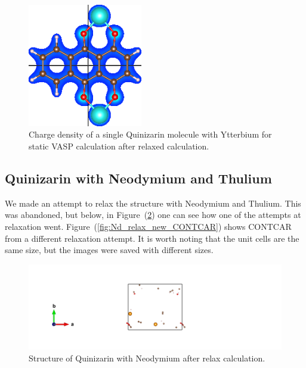 \documentclass{article}
\begin{document}
      \begin{figure}[H]
        \centering
        \includegraphics[width = 5cm]{../fig/Yb_staticafter_CHGDENSITY.png}
        \caption{Charge density of a single Quinizarin molecule with Ytterbium for static VASP calculation after relaxed calculation. }
        \label{fig:Yb_staticafter_CHGDENSITY}
      \end{figure}

      \vspace{1cm}

  \subsection{Quinizarin with Neodymium and Thulium}

    We made an attempt to relax the structure with Neodymium and Thulium. This was abandoned, but below, in Figure~(\ref{fig:Nd_relax_CONTCAR}) one can see how one of the attempts at relaxation went. Figure~(\ref{fig:Nd_relax_new_CONTCAR}) shows CONTCAR from a different relaxation attempt. It is worth noting that the unit cells are the same size, but the images were saved with different sizes. \\

      \begin{figure}[H]
        \centering
        \includegraphics[width = \textwidth]{../fig/Nd_relax_CONTCAR.png}
        \caption{Structure of Quinizarin with Neodymium after relax calculation.}
        \label{fig:Nd_relax_CONTCAR}
      \end{figure}
\end{document}
